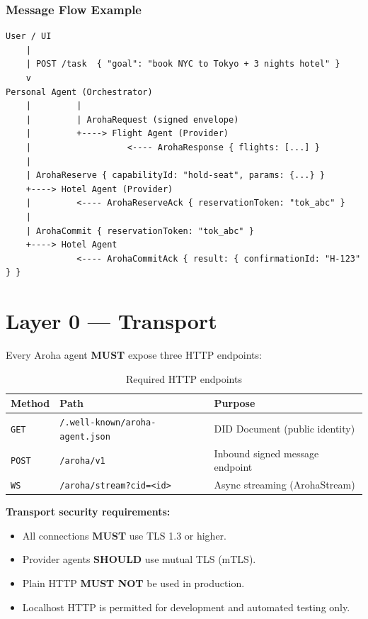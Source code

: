\documentclass[11pt,a4paper]{article}
\begin{document}
\subsubsection{Message Flow Example}

\begin{verbatim}
User / UI
    |
    | POST /task  { "goal": "book NYC to Tokyo + 3 nights hotel" }
    v
Personal Agent (Orchestrator)
    |         |
    |         | ArohaRequest (signed envelope)
    |         +----> Flight Agent (Provider)
    |                   <---- ArohaResponse { flights: [...] }
    |
    | ArohaReserve { capabilityId: "hold-seat", params: {...} }
    +----> Hotel Agent (Provider)
    |         <---- ArohaReserveAck { reservationToken: "tok_abc" }
    |
    | ArohaCommit { reservationToken: "tok_abc" }
    +----> Hotel Agent
              <---- ArohaCommitAck { result: { confirmationId: "H-123" } }
\end{verbatim}

\section{Layer 0 --- Transport}

Every Aroha agent \textbf{MUST} expose three HTTP endpoints:

\begin{table}[ht]
  \centering
  \renewcommand{\arraystretch}{1.3}
  \begin{tabularx}{\textwidth}{@{} l l X @{}}
    \toprule
    \textbf{Method} & \textbf{Path} & \textbf{Purpose} \\
    \midrule
    \texttt{GET}  & \texttt{/.well-known/aroha-agent.json} & DID Document (public identity) \\
    \texttt{POST} & \texttt{/aroha/v1}                     & Inbound signed message endpoint \\
    \texttt{WS}   & \texttt{/aroha/stream?cid=<id>}        & Async streaming (ArohaStream) \\
    \bottomrule
  \end{tabularx}
  \caption{Required HTTP endpoints}
\end{table}

\textbf{Transport security requirements:}
\begin{itemize}[noitemsep]
  \item All connections \textbf{MUST} use TLS 1.3 or higher.
  \item Provider agents \textbf{SHOULD} use mutual TLS (mTLS).
  \item Plain HTTP \textbf{MUST NOT} be used in production.
  \item Localhost HTTP is permitted for development and automated testing only.
\end{itemize}
\end{document}

